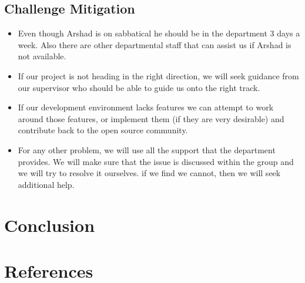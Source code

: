 \documentclass[a4paper]{article}
\begin{document}
\subsection{Challenge Mitigation}
\begin{itemize}
	\item Even though Arshad is on sabbatical he should be in the department 3 days a week. Also there are other departmental staff that can assist us if Arshad is not available.
	\item If our project is not heading in the right direction, we will seek guidance from our supervisor who should be able to guide us onto the right track.
	\item If our development environment lacks features we can attempt to work around those features, or implement them (if they are very desirable) and contribute back to the open source community.
	\item For any other problem, we will use all the support that the department provides. We will make sure that the issue is discussed within the group and we will try to resolve it ourselves. if we find we cannot, then we will seek additional help.
\end{itemize}

\clearpage


\section{Conclusion}

\clearpage

\appendixpage
\addappheadtotoc
\appendix


\section{References}
\renewcommand{\refname}{\vspace{-1cm}}


\end{document}
